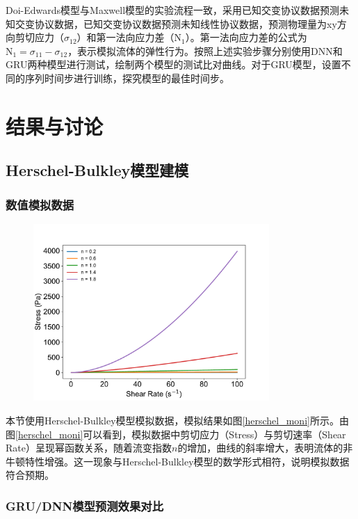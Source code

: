 Doi-Edwards模型与Maxwell模型的实验流程一致，采用已知交变协议数据预测未知交变协议数据，已知交变协议数据预测未知线性协议数据，预测物理量为xy方向剪切应力（$\sigma_{12}$）和第一法向应力差（$\text{N}_1$）。第一法向应力差的公式为$\text{N}_1=\sigma_{11}-\sigma_{12} $，表示模拟流体的弹性行为。按照上述实验步骤分别使用DNN和GRU两种模型进行测试，绘制两个模型的测试比对曲线。对于GRU模型，设置不同的序列时间步进行训练，探究模型的最佳时间步。

\section{结果与讨论}
\subsection{Herschel-Bulkley模型建模}
\subsubsection{数值模拟数据}
\begin{figure}[htbp]
  \centering
  \includegraphics[width=0.8\textwidth]{Fig/herschel_moni.pdf}
\end{figure}
本节使用Herschel-Bulkley模型模拟数据，模拟结果如图\ref{herschel_moni}所示。由图\ref{herschel_moni}可以看到，模拟数据中剪切应力（Stress）与剪切速率（Shear Rate）呈现幂函数关系，随着流变指数$n$的增加，曲线的斜率增大，表明流体的非牛顿特性增强。这一现象与Herschel-Bulkley模型的数学形式相符，说明模拟数据符合预期。
\subsubsection{GRU/DNN模型预测效果对比}

